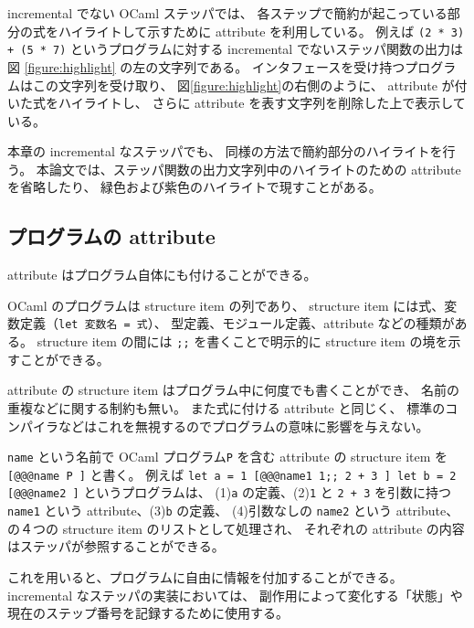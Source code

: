 incremental でない OCaml ステッパでは、
各ステップで簡約が起こっている部分の式をハイライトして示すために
attribute を利用している。
例えば \texttt{(2 * 3) + (5 * 7)} というプログラムに対する
incremental でないステッパ関数の出力は図 \ref{figure:highlight} の左の文字列である。
インタフェースを受け持つプログラムはこの文字列を受け取り、
図\ref{figure:highlight}の右側のように、
attribute が付いた式をハイライトし、
さらに attribute を表す文字列を削除した上で表示している。

本章の incremental なステッパでも、
同様の方法で簡約部分のハイライトを行う。
本論文では、ステッパ関数の出力文字列中のハイライトのための attribute を省略したり、
緑色および紫色のハイライトで現すことがある。

\subsection{プログラムの attribute}
\label{OCamlのattribute-プログラムのattribute}
attribute はプログラム自体にも付けることができる。

OCaml のプログラムは structure item の列であり、
structure item には式、変数定義（\texttt{let 変数名 = 式}）、
型定義、モジュール定義、attribute などの種類がある。
structure item の間には \texttt{;;} を書くことで明示的に structure item の境を示すことができる。

attribute の structure item はプログラム中に何度でも書くことができ、
名前の重複などに関する制約も無い。
また式に付ける attribute と同じく、
標準のコンパイラなどはこれを無視するのでプログラムの意味に影響を与えない。

\texttt{name} という名前で OCaml プログラム\texttt{P}
を含む attribute の structure item を \texttt{[@@@name P ]} と書く。
例えば \texttt{let a = 1 [@@@name1 1;; 2 + 3 ] let b = 2 [@@@name2 ]}
というプログラムは、
(1)\texttt{a} の定義、(2)\texttt{1} と \texttt{2 + 3}
を引数に持つ \texttt{name1} という attribute、(3)\texttt{b} の定義、
(4)引数なしの \texttt{name2} という attribute、
の４つの structure item のリストとして処理され、
それぞれの attribute の内容はステッパが参照することができる。

これを用いると、プログラムに自由に情報を付加することができる。
incremental なステッパの実装においては、
副作用によって変化する「状態」や現在のステップ番号を記録するために使用する。
